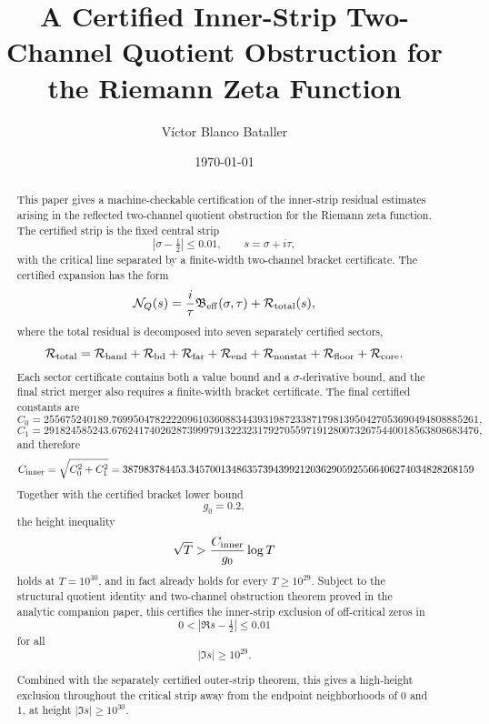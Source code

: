 \documentclass[11pt]{article}
\title{
A Certified Inner-Strip Two-Channel Quotient Obstruction
for the Riemann Zeta Function
}
\author{
V\'ictor Blanco Bataller
}
\date{\today}
\begin{document}
\maketitle
\begin{abstract}
This paper gives a machine-checkable certification of the inner-strip residual
estimates arising in the reflected two-channel quotient obstruction for the
Riemann zeta function.  The certified strip is the fixed central strip
\[
        |\sigma-\tfrac12|\le 0.01,
        \qquad s=\sigma+i\tau,
\]
with the critical line separated by a finite-width two-channel bracket
certificate.  The certified expansion has the form
\[
        \mathcal N_Q(s)
        =
        \frac{i}{\tau}\mathfrak B_{\rm eff}(\sigma,\tau)
        +
        \mathcal R_{\rm total}(s),
\]
where the total residual is decomposed into seven separately certified sectors,
\[
        \mathcal R_{\rm total}
        =
        \mathcal R_{\rm band}
        +
        \mathcal R_{\rm bd}
        +
        \mathcal R_{\rm far}
        +
        \mathcal R_{\rm end}
        +
        \mathcal R_{\rm nonstat}
        +
        \mathcal R_{\rm floor}
        +
        \mathcal R_{\rm core}.
\]
Each sector certificate contains both a value bound and a
\(\sigma\)-derivative bound, and the final strict merger also requires a
finite-width bracket certificate.  The final certified constants are
\[
        C_0
        =
        255675240189.76995047822220961036088344393198723387179813950427053690494808885261,
\]
\[
        C_1
        =
        291824585243.67624174026287399979132232317927055971912800732675440018563808683476,
\]
and therefore
\[
        C_{\rm inner}
        =
        \sqrt{C_0^2+C_1^2}
        =
        387983784453.345700134863573943992120362905925566406274034828268159
\]
Together with the certified bracket lower bound
\[
        g_0=0.2,
\]
the height inequality
\[
        \sqrt T>
        \frac{C_{\rm inner}}{g_0}\log T
\]
holds at \(T=10^{30}\), and in fact already holds for every
\(T\ge 10^{29}\).  Subject to the structural quotient identity and
two-channel obstruction theorem proved in the analytic companion paper, this
certifies the inner-strip exclusion of off-critical zeros in
\[
        0<|\Re s-\tfrac12|\le0.01
\]
for all
\[
        |\Im s|\ge10^{29}.
\]

Combined with the separately certified outer-strip theorem, this gives a
high-height exclusion throughout the critical strip away from the endpoint
neighborhoods of \(0\) and \(1\), at height \(|\Im s|\ge10^{30}\).
\end{abstract}
\end{document}
